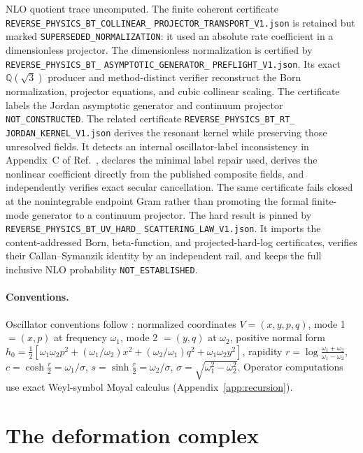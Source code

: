 \documentclass[11pt]{article}
\theoremstyle{definition}
\theoremstyle{remark}
\newcommand{\w}{\omega}
\begin{document}
NLO quotient trace uncomputed.
The finite coherent certificate
\texttt{REVERSE\_PHYSICS\_BT\_COLLINEAR\_}
\allowbreak\texttt{PROJECTOR\_TRANSPORT\_V1.json} is retained but marked
\texttt{SUPERSEDED\_}\allowbreak\texttt{NORMALIZATION}: it used an absolute
rate coefficient in a
dimensionless projector.  The dimensionless normalization is certified by
\texttt{REVERSE\_PHYSICS\_BT\_}\allowbreak
\texttt{ASYMPTOTIC\_GENERATOR\_}\allowbreak
\texttt{PREFLIGHT\_V1.json}.  Its exact
$\mathbb Q(\sqrt3)$ producer and method-distinct verifier reconstruct the
Born normalization, projector equations, and cubic collinear scaling.  The
certificate labels the Jordan asymptotic generator and continuum projector
\texttt{NOT\_CONSTRUCTED}.  The related certificate
\texttt{REVERSE\_PHYSICS\_BT\_RT\_}
\allowbreak\texttt{JORDAN\_KERNEL\_V1.json}
derives the resonant kernel while preserving those unresolved fields.  It
detects an internal oscillator-label
inconsistency in Appendix~C of Ref.~\cite{BT2026}, declares the minimal label
repair used, derives the nonlinear coefficient directly from the published
composite fields, and independently verifies exact secular cancellation.
The same certificate fails closed at the nonintegrable endpoint Gram rather
than promoting the formal finite-mode generator to a continuum projector.
The hard result is pinned by
\texttt{REVERSE\_PHYSICS\_BT\_UV\_HARD\_}\allowbreak
\texttt{SCATTERING\_}\allowbreak\texttt{LAW\_V1.json}.  It imports the
content-addressed Born,
beta-function, and projected-hard-log certificates, verifies their
Callan--Symanzik identity by an independent rail, and keeps the full inclusive
NLO probability \texttt{NOT\_ESTABLISHED}.

\paragraph{Conventions.}
Oscillator conventions follow \cite{paperI,paperII}: normalized
coordinates $V=(x,y,p,q)$, mode 1 $=(x,p)$ at frequency $\w_1$, mode 2
$=(y,q)$ at $\w_2$, positive normal form
$h_0=\tfrac12[\w_1\w_2p^2+(\w_1/\w_2)x^2+(\w_2/\w_1)q^2+\w_1\w_2y^2]$,
rapidity $r=\log\frac{\w_1+\w_2}{\w_1-\w_2}$,
$c=\cosh\tfrac r2=\w_1/\sigma$, $s=\sinh\tfrac r2=\w_2/\sigma$,
$\sigma=\sqrt{\w_1^2-\w_2^2}$.  Operator computations use exact
Weyl-symbol Moyal calculus (Appendix~\ref{app:recursion}).

\section{The deformation complex}\label{sec:complex}
\end{document}
